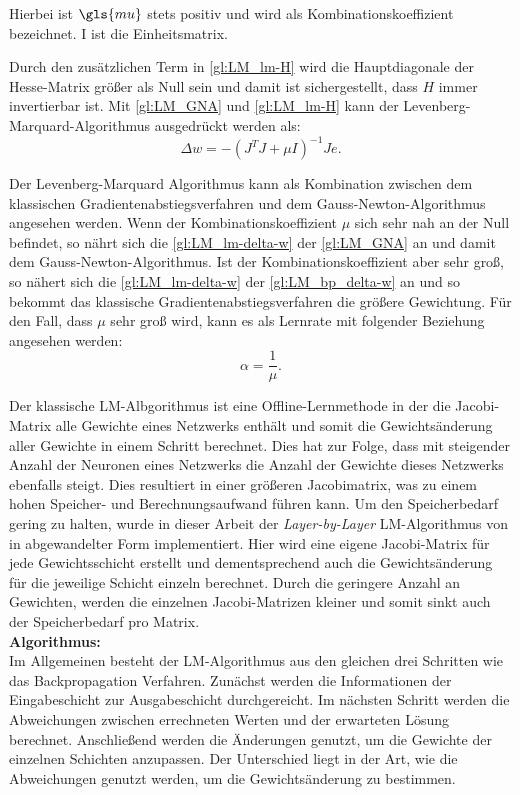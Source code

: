 Hierbei ist $\gls{mu}$ stets positiv und wird als Kombinationskoeffizient bezeichnet. I ist die Einheitsmatrix.

Durch den zusätzlichen Term in \autoref{gl:LM_lm-H} wird die Hauptdiagonale der Hesse-Matrix größer als Null sein und damit ist sichergestellt, dass $H$ immer invertierbar ist. Mit \autoref{gl:LM_GNA} und \autoref{gl:LM_lm-H} kann der Levenberg-Marquard-Algorithmus ausgedrückt werden als:
\begin{equation}
\Delta w =-(J^T J + \mu I)^{-1} J e.
\label{gl:LM_lm-delta-w}
\end{equation}

Der Levenberg-Marquard Algorithmus kann als Kombination zwischen dem klassischen Gradientenabstiegsverfahren und dem Gauss-Newton-Algorithmus angesehen werden. Wenn der Kombinationskoeffizient $\mu$ sich sehr nah an der Null befindet, so nährt sich die \autoref{gl:LM_lm-delta-w} der \autoref{gl:LM_GNA} an und damit dem Gauss-Newton-Algorithmus. Ist der Kombinationskoeffizient aber sehr groß, so nähert sich die \autoref{gl:LM_lm-delta-w} der \autoref{gl:LM_bp_delta-w} an und so bekommt das klassische Gradientenabstiegsverfahren die größere Gewichtung. Für den Fall, dass $\mu$ sehr groß wird, kann es als Lernrate mit folgender Beziehung angesehen werden:\,
\begin{equation}
\alpha = \frac{1}{\mu}.
\label{gl:LM_lernrate}
\end{equation}

Der klassische LM-Albgorithmus ist eine Offline-Lernmethode in der die Jacobi-Matrix alle Gewichte eines Netzwerks enthält und somit die Gewichtsänderung aller Gewichte in einem Schritt berechnet. Dies hat zur Folge, dass mit steigender Anzahl der Neuronen eines Netzwerks die Anzahl der Gewichte dieses Netzwerks ebenfalls steigt. Dies resultiert in einer größeren Jacobimatrix, was zu einem hohen Speicher- und Berechnungsaufwand führen kann. Um den Speicherbedarf gering zu halten, wurde in dieser Arbeit der \textit{Layer-by-Layer} LM-Algorithmus von \citet{Kwak2012} in abgewandelter Form implementiert. Hier wird eine eigene Jacobi-Matrix für jede Gewichtsschicht erstellt und dementsprechend auch die Gewichtsänderung für die jeweilige Schicht einzeln berechnet. Durch die geringere Anzahl an Gewichten, werden die einzelnen Jacobi-Matrizen kleiner und somit sinkt auch der Speicherbedarf pro Matrix.\\

\textbf{Algorithmus:}\,\\
Im Allgemeinen besteht der LM-Algorithmus aus den gleichen drei Schritten wie das Backpropagation Verfahren. Zunächst werden die Informationen der Eingabeschicht zur Ausgabeschicht durchgereicht. Im nächsten Schritt werden die Abweichungen zwischen errechneten Werten und der erwarteten Lösung berechnet. Anschließend werden die Änderungen genutzt, um die Gewichte der einzelnen Schichten anzupassen. Der Unterschied liegt in der Art, wie die Abweichungen genutzt werden, um die Gewichtsänderung zu bestimmen.

